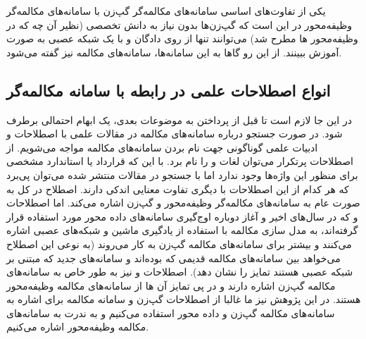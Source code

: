 یکی از تفاوت‌های اساسی سامانه‌های مکالمه‌گر گپ‌زن با سامانه‌های مکالمه‌گر وظیفه‌محور در این است که گپ‌زن‌ها بدون نیاز به دانش تخصصی (نظیر آن چه که در وظیفه‌محور ها مطرح شد) می‌توانند تنها از روی دادگان و با یک شبکه عصبی به صورت
آموزش ببینند. از این رو گاها به این سامانه‌ها، سامانه‌های مکالمه 
 نیز گفته می‌شود.

	
\subsection{انواع اصطلاحات علمی در رابطه با سامانه مکالمه‌گر}

در این جا لازم است تا قبل از پرداختن به موضوعات بعدی، یک ابهام احتمالی برطرف شود. در صورت جستجو درباره سامانه‌های مکالمه در مقالات علمی با اصطلاحات و ادبیات علمی گوناگونی جهت نام بردن سامانه‌های مکالمه مواجه می‌شویم. از اصطلاحات پرتکرار می‌توان لغات 
و
را نام برد.
با این که قرارداد یا استاندارد مشخصی برای منظور این واژه‌ها وجود ندارد اما با جستجو در مقالات منتشر شده می‌توان پی‌برد که هر کدام از این اصطلاحات با دیگری تفاوت  معنایی اندکی دارند. اصطلاح 
در کل به صورت عام به سامانه‌های مکالمه‌گر وظیفه‌محور و گپ‌زن اشاره می‌کند. 
اما اصطلاحات 
و
که در سال‌های اخیر و آغاز دوباره اوج‌گیری سامانه‌های داده محور مورد استفاده قرار گرفته‌اند، به مدل سازی مکالمه با استفاده از یادگیری ماشین و شبکه‌های عصبی اشاره می‌کنند و بیشتر برای سامانه‌های مکالمه گپ‌زن به کار می‌روند (به نوعی این اصطلاح می‌خواهد بین سامانه‌های مکالمه قدیمی که 
بود‌ه‌اند و سامانه‌های جدید که مبتنی بر شبکه عصبی هستند تمایز را نشان دهد).
اصطلاحات 
و 
نیز به طور خاص به سامانه‌های مکالمه گپ‌زن اشاره دارند و در پی تمایز آن ها از سامانه‌های مکالمه وظیفه‌محور هستند. 
در این پژوهش نیز ما غالبا از اصطلاحات گپ‌زن  و سامانه مکالمه برای اشاره به سامانه‌های مکالمه گپ‌زن و داده محور استفاده می‌کنیم و به ندرت به سامانه‌های مکالمه وظیفه‌محور اشاره می‌کنیم. 

